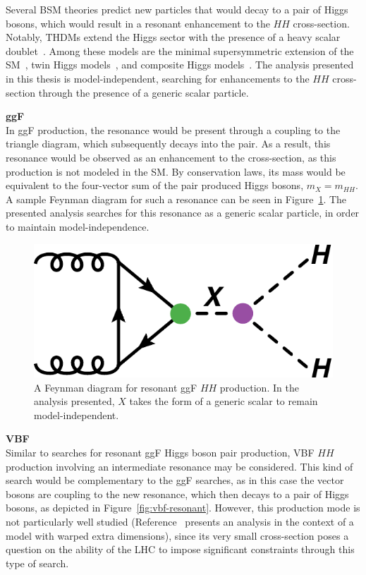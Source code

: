 Several \gls{BSM} theories predict new particles that would decay to a pair of Higgs bosons, which would result in a resonant enhancement to the $HH$ cross-section. Notably, \glspl{THDM} extend the Higgs sector with the presence of a heavy scalar doublet~\cite{THDM, thdm2}. Among these models are the minimal supersymmetric extension of the \gls{SM}~\cite{mssm, hmssm2, hmssm3}, twin Higgs models~\cite{twinHiggs, twinHiggs2}, and composite Higgs models~\cite{compositeHiggs}. The analysis presented in this thesis is model-independent, searching for enhancements to the $HH$ cross-section through the presence of a generic scalar particle.

\noindent\textbf{\gls{ggF}}\\
\indent In \gls{ggF} production, the resonance would be present through a coupling to the triangle diagram, which subsequently decays into the \hh pair. As a result, this resonance would be observed as an enhancement to the \hh cross-section, as this production is not modeled in the \gls{SM}. By conservation laws, its mass would be equivalent to the four-vector sum of the pair produced Higgs bosons, $m_{X} = m_{HH}$. A sample Feynman diagram for such a resonance can be seen in Figure~\ref{fig:ggf-resonant}. The presented analysis searches for this resonance as a generic scalar particle, in order to maintain model-independence.


\begin{figure}[!htbp]
    \centering
    \includegraphics[width=.45\textwidth]{chapters/chapter1_theory/images/hh_res_ggf.pdf}
    \caption{A Feynman diagram for resonant ggF  $HH$ production. In the analysis presented, $X$ takes the form of a generic scalar to remain model-independent.}
    \label{fig:ggf-resonant}
\end{figure}

\noindent\textbf{VBF}\\
\indent Similar to searches for resonant ggF Higgs boson pair production, \gls{VBF} $HH$
production involving an intermediate resonance may be considered. This kind of search would be complementary to the ggF searches, as in this case the vector bosons are coupling to the new resonance, which then decays to a pair of Higgs bosons, as depicted in Figure~\ref{fig:vbf-resonant}. However, this production mode is not
particularly well studied (Reference~\cite{res_vbf} presents an analysis in the context of a model with warped extra dimensions), since its very small cross-section poses a question on the ability of the LHC to impose significant constraints through this type of search.

